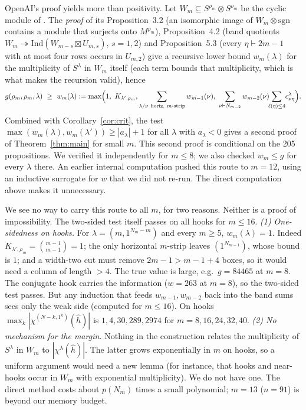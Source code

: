 \documentclass[11pt]{amsart}
\theoremstyle{remark}
\begin{document}
OpenAI's proof yields more than positivity. Let $W_m\subseteq S^{\rho_m}\otimes S^{\rho_m}$
be the cyclic module of \cite[\S3]{SaxlCyclic}. The \emph{proof} of its Proposition~3.2 (an isomorphic image of
$W_m\otimes\mathrm{sgn}$ contains a module that surjects onto $M^{\rho_m}$), Proposition~4.2 (band quotients
$W_m\twoheadrightarrow\mathrm{Ind}(W_{m-s}\boxtimes U_{m,s})$, $s=1,2$) and Proposition~5.3
(every $\eta\vdash2m-1$ with at most four rows occurs in $U_{m,2}$) give a recursive lower bound $w_m(\lambda)$ for the multiplicity of $S^\lambda$ in $W_m$
itself (each term bounds that multiplicity, which is what makes the recursion valid), hence
\[ g(\rho_m,\rho_m,\lambda)\ \ge\ w_m(\lambda):=\max\Bigl(1,\ K_{\lambda',\rho_m},
\sum_{\lambda/\nu\ \text{horiz.}\ m\text{-strip}} w_{m-1}(\nu),\
\sum_{\nu\vdash N_{m-2}} w_{m-2}(\nu)\!\!\sum_{\ell(\eta)\le4}\! c^\lambda_{\nu\eta}\Bigr). \]
Combined with Corollary~\ref{cor:crit}, the test $\max(w_m(\lambda),w_m(\lambda'))\ge|a_\lambda|+1$
for all $\lambda$ with $a_\lambda<0$ gives a second proof of Theorem~\ref{thm:main} for small
$m$. This second proof is conditional on the 205 propositions. We verified it independently
for $m\le8$; we also checked $w_m\le g$ for every $\lambda$ there. An earlier internal
computation pushed this route to $m=12$, using an inductive surrogate for $w$ that we did not
re-run. The direct computation above makes it unnecessary.

We see no way to carry this route to all $m$, for two reasons. Neither is a proof of
impossibility. The two-sided test itself passes on all hooks for $m\le16$.
\emph{(1) One-sidedness on hooks.} For $\lambda=(m,1^{N_m-m})$ and every $m\ge5$,
$w_m(\lambda)=1$. Indeed $K_{\lambda',\rho_m}=\binom{m-1}{m-1}=1$; the only horizontal
$m$-strip leaves $(1^{N_{m-1}})$, whose bound is $1$; and a width-two cut must remove
$2m-1>m-1+4$ boxes, so it would need a column of length $>4$. The true value is large, e.g.\
$g=84465$ at $m=8$. The conjugate hook carries the information ($w=263$ at $m=8$), so the
two-sided test passes. But any induction that feeds $w_{m-1},w_{m-2}$ back into the band sums
sees only the weak side (computed for $m\le16$). On hooks $\max_k|\chi^{(N-k,1^k)}(\hat h)|$ is $1,4,30,289,2974$ for $m=8,16,24,32,40$.
\emph{(2) No mechanism for the margin.} Nothing in the construction relates the multiplicity
of $S^\lambda$ in $W_m$ to $|\chi^\lambda(\hat h)|$. The latter grows exponentially in $m$ on
hooks, so a uniform argument would need a new lemma (for instance, that hooks and near-hooks
occur in $W_m$ with exponential multiplicity). We do not have one. The direct method costs
about $p(N_m)$ times a small polynomial; $m=13$ ($n=91$) is beyond our memory budget.
\end{document}
